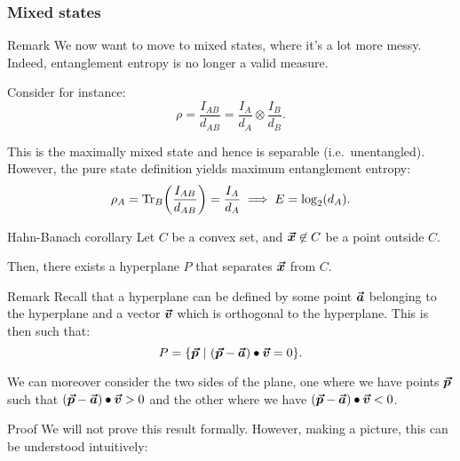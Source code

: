 \documentclass[a4paper]{article}
\begin{document}
\subsubsection{Mixed states}

\begin{parag}{Remark}
    We now want to move to mixed states, where it's a lot more messy. Indeed, entanglement entropy is no longer a valid measure.

    Consider for instance: 
    \[\rho = \frac{I_{AB}}{d_{AB}} = \frac{I_A}{d_A} \otimes \frac{I_B}{d_B}.\]

    This is the maximally mixed state and hence is separable (i.e.~unentangled). However, the pure state definition yields maximum entanglement entropy: 
    \[\rho_A = \Tr_B\left(\frac{I_{AB}}{d_{AB}}\right) = \frac{I_A}{d_A} \implies E = \log_2\left(d_A\right).\]
\end{parag}

\begin{parag}{Hahn-Banach corollary}
    Let $C$ be a convex set, and $\bm{\protect\vec{x}} \not\in C$ be a point outside $C$.

    Then, there exists a hyperplane $P$ that separates $\bm{\protect\vec{x}}$ from $C$.

    \begin{subparag}{Remark}
        Recall that a hyperplane can be defined by some point $\bm{\protect\vec{a}}$ belonging to the hyperplane and a vector $\bm{\protect\vec{v}}$ which is orthogonal to the hyperplane. This is then such that:
        \[P = \left\{\bvec{p} \suchthat \left(\bvec{p} - \bvec{a}\right) \dotprod \bvec{v} = 0\right\}.\]

        We can moreover consider the two sides of the plane, one where we have points $\bm{\protect\vec{p}}$ such that $\left(\bvec{p} - \bvec{a}\right) \dotprod \bvec{v} > 0$ and the other where we have $\left(\bvec{p} - \bvec{a}\right) \dotprod \bvec{v} < 0$.
    \end{subparag}

    \begin{subparag}{Proof}
        We will not prove this result formally. However, making a picture, this can be understood intuitively:
    \end{subparag}
\end{parag}
\end{document}
